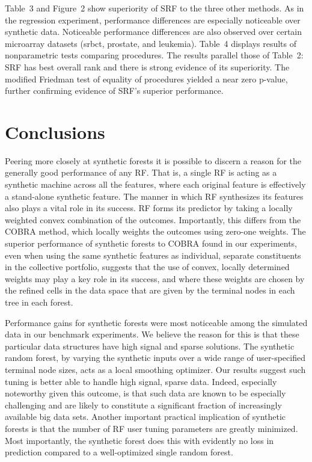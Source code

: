 \documentclass{bmcart}
\begin{document}
Table~3 and Figure~2 show superiority of SRF to the three other
methods.  As in the regression experiment, performance differences are
especially noticeable over synthetic data.  Noticeable performance
differences are also observed over certain microarray datasets (srbct,
prostate, and leukemia).  Table~4 displays results of nonparametric
tests comparing procedures.  The results parallel those of Table~2:
SRF has best overall rank and there is strong evidence of its
superiority.  The modified Friedman test of equality of procedures
yielded a near zero p-value, further confirming evidence of SRF's
superior performance.

\section*{Conclusions}

Peering more closely at synthetic forests it is possible to discern a
reason for the generally good performance of any RF. That is, a single
RF is acting as a synthetic machine across all the features, where
each original feature is effectively a stand-alone synthetic feature.
The manner in which RF synthesizes its features also plays a vital
role in its success.  RF forms its predictor by taking a locally
weighted convex combination of the outcomes.  Importantly, this
differs from the COBRA method, which locally weights the outcomes
using zero-one weights.  The superior performance of synthetic forests
to COBRA found in our experiments, even when using the same synthetic
features as individual, separate constituents in the collective
portfolio, suggests that the use of convex, locally determined weights
may play a key role in its success, and where these weights are chosen
by the refined cells in the data space that are given by the terminal
nodes in each tree in each forest.  

Performance gains for synthetic forests were most noticeable among the
simulated data in our benchmark experiments. We believe the reason for
this is that these particular data structures have high signal and
sparse solutions.  The synthetic random forest, by varying the
synthetic inputs over a wide range of user-specified terminal node
sizes, acts as a local smoothing optimizer.  Our results suggest such
tuning is better able to handle high signal, sparse data.  Indeed,
especially noteworthy given this outcome, is that such data are known
to be especially challenging and are likely to constitute a
significant fraction of increasingly available big data sets.  Another
important practical implication of synthetic forests is that the
number of RF user tuning parameters are greatly minimized.  Most
importantly, the synthetic forest does this with evidently no loss in
prediction compared to a well-optimized single random forest.
\end{document}
